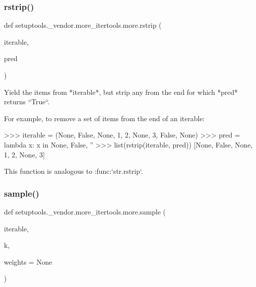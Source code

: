 \subsubsection{\texorpdfstring{rstrip()}{rstrip()}}
{\footnotesize\ttfamily def setuptools.\+\_\+vendor.\+more\+\_\+itertools.\+more.\+rstrip (\begin{DoxyParamCaption}\item[{}]{iterable,  }\item[{}]{pred }\end{DoxyParamCaption})}

\begin{DoxyVerb}Yield the items from *iterable*, but strip any from the end
for which *pred* returns ``True``.

For example, to remove a set of items from the end of an iterable:

    >>> iterable = (None, False, None, 1, 2, None, 3, False, None)
    >>> pred = lambda x: x in {None, False, ''}
    >>> list(rstrip(iterable, pred))
    [None, False, None, 1, 2, None, 3]

This function is analogous to :func:`str.rstrip`.\end{DoxyVerb}
 \mbox{\label{namespacesetuptools_1_1__vendor_1_1more__itertools_1_1more_a91548632a1b9f5d55b2a9b6a7783fd5e}} 
\subsubsection{\texorpdfstring{sample()}{sample()}}
{\footnotesize\ttfamily def setuptools.\+\_\+vendor.\+more\+\_\+itertools.\+more.\+sample (\begin{DoxyParamCaption}\item[{}]{iterable,  }\item[{}]{k,  }\item[{}]{weights = {\ttfamily None} }\end{DoxyParamCaption})}

